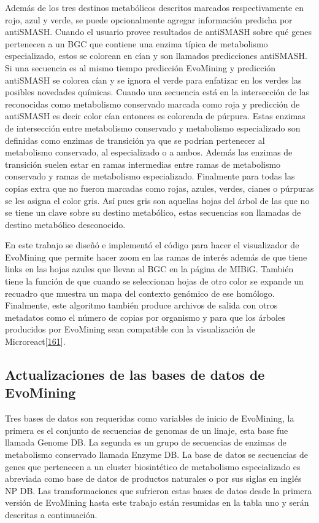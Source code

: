 \documentclass[12pt,twoside]{reedthesis}
\begin{document}
  Además de los tres destinos metabólicos descritos marcados
  respectivamente en rojo, azul y verde, se puede opcionalmente agregar
  información predicha por antiSMASH. Cuando el usuario provee resultados
  de antiSMASH sobre qué genes pertenecen a un BGC que contiene una enzima
  típica de metabolismo especializado, estos se colorean en cían y son
  llamados predicciones antiSMASH. Si una secuencia es al mismo tiempo
  predicción EvoMining y predicción antiSMASH se colorea cían y se ignora
  el verde para enfatizar en los verdes las posibles novedades químicas.
  Cuando una secuencia está en la intersección de las reconocidas como
  metabolismo conservado marcada como roja y predicción de antiSMASH es
  decir color cían entonces es coloreada de púrpura. Estas enzimas de
  intersección entre metabolismo conservado y metabolismo especializado
  son definidas como enzimas de transición ya que se podrían pertenecer al
  metabolismo conservado, al especializado o a ambos. Además las enzimas
  de transición suelen estar en ramas intermedias entre ramas de
  metabolismo conservado y ramas de metabolismo especializado. Finalmente
  para todas las copias extra que no fueron marcadas como rojas, azules,
  verdes, cianes o púrpuras se les asigna el color gris. Así pues gris son
  aquellas hojas del árbol de las que no se tiene un clave sobre su
  destino metabólico, estas secuencias son llamadas de destino metabólico
  desconocido.
  
  En este trabajo se diseñó e implementó el código para hacer el
  visualizador de EvoMining que permite hacer zoom en las ramas de interés
  además de que tiene links en las hojas azules que llevan al BGC en la
  página de MIBiG. También tiene la función de que cuando se seleccionan
  hojas de otro color se expande un recuadro que muestra un mapa del
  contexto genómico de ese homólogo. Finalmente, este algoritmo también
  produce archivos de salida con otros metadatos como el número de copias
  por organismo y para que los árboles producidos por EvoMining sean
  compatible con la visualización de
  Microreact{[}\protect\hyperlink{ref-argimon_microreact_2016}{161}{]}.
  
  \subsection{Actualizaciones de las bases de datos de
  EvoMining}\label{actualizaciones-de-las-bases-de-datos-de-evomining}
  
  Tres bases de datos son requeridas como variables de inicio de
  EvoMining, la primera es el conjunto de secuencias de genomas de un
  linaje, esta base fue llamada Genome DB. La segunda es un grupo de
  secuencias de enzimas de metabolismo conservado llamada Enzyme DB. La
  base de datos se secuencias de genes que pertenecen a un cluster
  biosintético de metabolismo especializado es abreviada como base de
  datos de productos naturales o por sus siglas en inglés NP DB. Las
  transformaciones que sufrieron estas bases de datos desde la primera
  versión de EvoMining hasta este trabajo están resumidas en la tabla uno
  y serán descritas a continuación.
  
\end{document}
